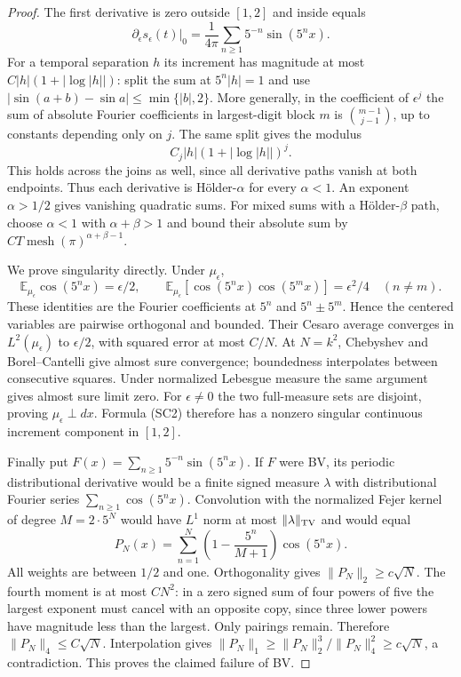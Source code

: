 \documentclass[11pt]{article}
\theoremstyle{definition}\newtheorem{definition}[theorem]{Definition}
\theoremstyle{remark}\newtheorem{remark}[theorem]{Remark}
\begin{document}
\begin{proof}
The first derivative is zero outside $[1,2]$ and inside equals
\[
 \left.\partial_\epsilon s_\epsilon(t)\right|_0
    =\frac1{4\pi}\sum_{n\ge1}5^{-n}\sin(5^nx).
 \tag{SC3}
\]
For a temporal separation $h$ its increment has magnitude at most
$C|h|(1+|\log|h||)$: split the sum at $5^n|h|=1$ and use
$|\sin(a+b)-\sin a|\le\min\{|b|,2\}$. More generally, in the
coefficient of $\epsilon^j$ the sum of absolute Fourier coefficients
in largest-digit block $m$ is
$\binom{m-1}{j-1}$, up to constants depending only on $j$.
The same split gives the modulus
\[
 C_j|h|(1+|\log|h||)^j.
 \tag{SC4}
\]
This holds across the joins as well, since all derivative paths vanish
at both endpoints. Thus each derivative is H\"older-$\alpha$ for every
$\alpha<1$. An exponent $\alpha>1/2$ gives vanishing quadratic sums.
For mixed sums with a H\"older-$\beta$ path, choose
$\alpha<1$ with $\alpha+\beta>1$ and bound their absolute sum by
$C T\operatorname{mesh}(\pi)^{\alpha+\beta-1}$.

We prove singularity directly. Under $\mu_\epsilon$,
\[
 \mathbb E_{\mu_\epsilon}\cos(5^n x)=\epsilon/2,
 \qquad
 \mathbb E_{\mu_\epsilon}[\cos(5^n x)\cos(5^m x)]
                  =\epsilon^2/4\quad(n\ne m).
\]
These identities are the Fourier coefficients at $5^n$ and
$5^n\pm5^m$. Hence the centered variables are pairwise orthogonal
and bounded. Their Cesaro average converges in $L^2(\mu_\epsilon)$
to $\epsilon/2$, with squared error at most $C/N$. At $N=k^2$,
Chebyshev and Borel--Cantelli give almost sure convergence; boundedness
interpolates between consecutive squares. Under normalized Lebesgue
measure the same argument gives almost sure limit zero. For
$\epsilon\ne0$ the two full-measure sets are disjoint, proving
$\mu_\epsilon\perp dx$. Formula (SC2) therefore has a nonzero singular
continuous increment component in $[1,2]$.

Finally put $F(x)=\sum_{n\ge1}5^{-n}\sin(5^nx)$. If $F$ were BV,
its periodic distributional derivative would be a finite signed measure
$\lambda$ with distributional Fourier series $\sum_{n\ge1}\cos(5^nx)$.
Convolution with the normalized Fejer kernel of degree $M=2\cdot5^N$
would have $L^1$ norm at most $\|\lambda\|_{\rm TV}$ and would equal
\[
 P_N(x)=\sum_{n=1}^N
        \left(1-\frac{5^n}{M+1}\right)\cos(5^nx).
\]
All weights are between $1/2$ and one. Orthogonality gives
$\|P_N\|_2\ge c\sqrt N$. The fourth moment is at most $CN^2$:
in a zero signed sum of four powers of five the largest exponent must
cancel with an opposite copy, since three lower powers have magnitude
less than the largest. Only pairings remain. Therefore
$\|P_N\|_4\le C\sqrt N$. Interpolation gives
$\|P_N\|_1\ge\|P_N\|_2^3/\|P_N\|_4^2\ge c\sqrt N$, a contradiction.
This proves the claimed failure of BV.
\end{proof}
\end{document}
